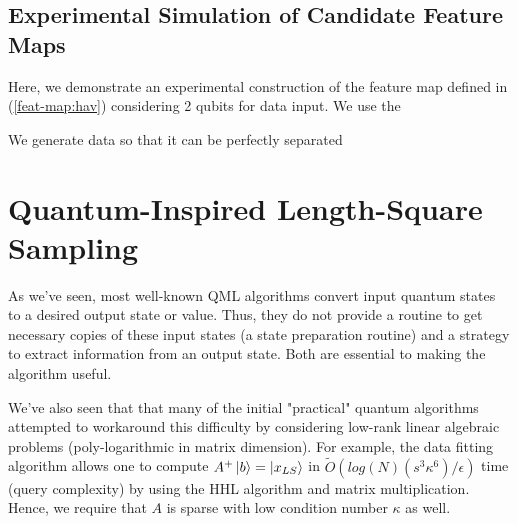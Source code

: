 \documentclass[main.tex]{subfiles}
\begin{document}
\section{Experimental Simulation of Candidate Feature Maps}
%
%
%

Here, we demonstrate an experimental construction of the feature map defined in (\ref{feat-map:hav}) considering 2 qubits for data input. We use the 

We generate data so that it can be perfectly separated 

\chapter{Quantum-Inspired Length-Square Sampling}
\label{sec:tang}

As we've seen, most well-known QML algorithms convert input quantum states to a desired output state or value. Thus, they do not provide a routine to get necessary copies of these input states (a state preparation routine) and a strategy to extract information from an output state. Both are essential to making the algorithm useful.

We've also seen that that many of the initial "practical" quantum algorithms attempted to workaround this difficulty by considering low-rank linear algebraic problems (poly-logarithmic in matrix dimension). For example, the data fitting algorithm \cite{wiebe2012quantum} allows one to compute $A^+ \ket{b} = \ket{x_{LS}}$ in $\tilde{O}(log(N)(s^3\kappa^6)/ \epsilon)$ time (query complexity) by using the HHL algorithm and matrix multiplication. Hence, we require that $A$ is sparse with low condition number $\kappa$ as well.
\end{document}
